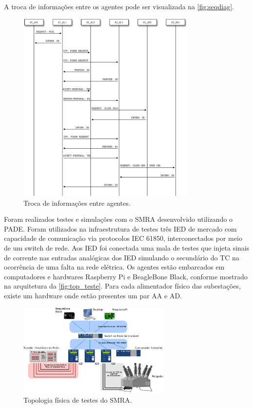 \documentclass[journal]{IEEEtran}
\begin{document}
A troca de informações entre os agentes pode ser visualizada na \autoref{fig:seqdiag}.

\begin{figure}[htb]
  \centering
  \includegraphics[width=3.5in]{Figuras/diag_seq.eps}
  \caption{\label{fig:seqdiag}Troca de informações entre agentes.}
\end{figure}

Foram realizados testes e simulações com o SMRA desenvolvido utilizando o PADE. Foram utilizados na infraestrutura de testes três IED de mercado com capacidade de comunicação via protocolos IEC 61850, interconectados por meio de um switch de rede. Aos IED foi conectada uma mala de testes que injeta sinais de corrente nas entradas analógicas dos IED simulando o secundário do TC na ocorrência de uma falta na rede elétrica. Os agentes estão embarcados em computadores e hardwares Raspberry Pi e BeagleBone Black, conforme mostrado na arquitetura da \autoref{fig:top_teste}. Para cada alimentador físico das subestações, existe um hardware onde estão presentes um par AA e AD.

\begin{figure}[htb]
    \centering
    \includegraphics[width=3.0in]{Figuras/topologia_de_testes.eps}
    \caption{\label{fig:top_teste} Topologia física de testes do SMRA.}    
\end{figure}
\end{document}
